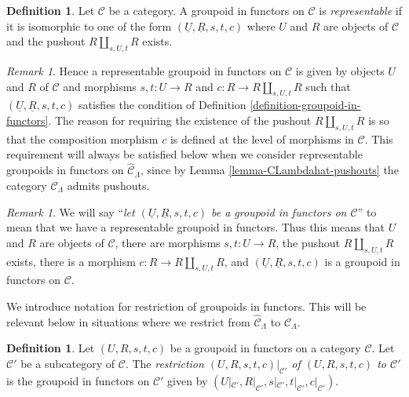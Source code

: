 \documentclass{stacks-project}
\theoremstyle{plain}
\theoremstyle{definition}
\newtheorem{definition}[subsection]{Definition}
\theoremstyle{remark}
\newtheorem{remark}[subsection]{Remark}
\numberwithin{equation}{subsection}
\begin{document}
\begin{definition}
\label{definition-representable}
Let $\mathcal{C}$ be a category. A groupoid in functors on $\mathcal{C}$ is
{\it representable} if it is isomorphic to one of the form
$(\underline{U}, \underline{R}, s, t, c)$ where $U$ and $R$ are objects of
$\mathcal{C}$ and the pushout $R \amalg_{s, U, t} R$ exists.
\end{definition}

\begin{remark}
\label{remark-reason-existence-coproduct}
Hence a representable groupoid in functors on $\mathcal{C}$ is given by
objects $U$ and $R$ of $\mathcal{C}$ and morphisms $s, t : U \to R$ and
$c : R \to R \amalg_{s, U, t} R$ such that
$(\underline{U}, \underline{R}, s, t, c)$ satisfies the condition of
Definition \ref{definition-groupoid-in-functors}. The reason for requiring
the existence of the pushout $R \amalg_{s, U, t} R$ is so that the composition
morphism $c$ is defined at the level of morphisms in $\mathcal{C}$.
This requirement will always be satisfied below when we consider
representable groupoids in functors on
$\widehat{\mathcal{C}}_\Lambda$, since by
Lemma \ref{lemma-CLambdahat-pushouts}
the category $\widehat{\mathcal{C}}_\Lambda$ admits pushouts.
\end{remark}

\begin{remark}
\label{remark-simplify-terminology}
We will say ``{\it let $(\underline{U}, \underline{R}, s, t, c)$ be a
groupoid in functors on $\mathcal{C}$}'' to mean that we have
a representable groupoid in functors. Thus this means that
$U$ and $R$ are objects of $\mathcal{C}$, there are morphisms
$s, t : U \to R$, the pushout $R \amalg_{s, U, t} R$ exists,
there is a morphism $c : R \to R \amalg_{s, U, t} R$, and
$(\underline{U}, \underline{R}, s, t, c)$ is a
groupoid in functors on $\mathcal{C}$.
\end{remark}

\noindent
We introduce notation for restriction of groupoids in functors. This will be
relevant below in situations where we restrict from $\widehat{\mathcal
C}_\Lambda$ to $\mathcal{C}_\Lambda$.

\begin{definition}
\label{definition-restricting-groupoids-in-functors}
Let $(U, R, s, t, c)$ be a groupoid in functors on a category $\mathcal{C}$.
Let $\mathcal{C}'$ be a subcategory of $\mathcal{C}$. The
{\it restriction $(U, R, s, t, c)|_{\mathcal{C}'}$ of $(U, R, s, t, c)$
to $\mathcal{C}'$} is the groupoid
in functors on $\mathcal{C}'$ given by $(U|_{\mathcal{C}'}, R|_{\mathcal
C'}, s|_{\mathcal{C}'}, t|_{\mathcal{C}'}, c|_{\mathcal{C}'})$.
\end{definition}
\end{document}

